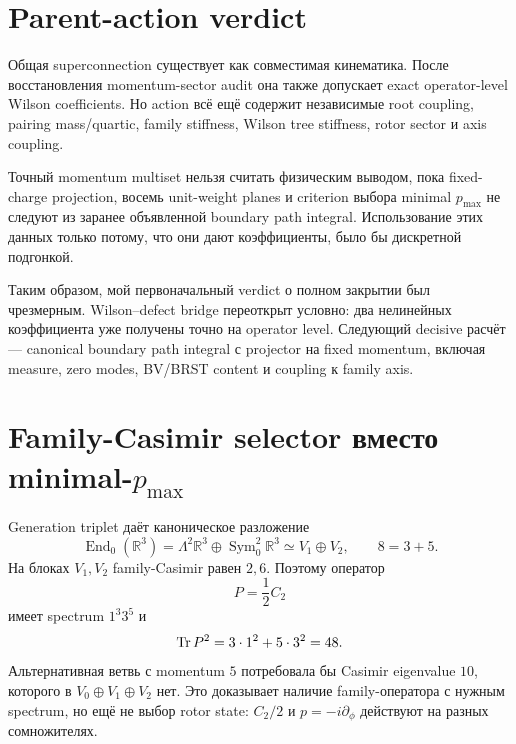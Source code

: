\section{Parent-action verdict}

Общая superconnection существует как совместимая кинематика. После
восстановления momentum-sector audit она также допускает exact operator-level
Wilson coefficients. Но action всё ещё содержит независимые root coupling,
pairing mass/quartic, family stiffness, Wilson tree stiffness, rotor sector
и axis coupling.

\begin{nogocriterion}
Точный momentum multiset нельзя считать физическим выводом, пока fixed-charge
projection, восемь unit-weight planes и criterion выбора minimal
\(p_{\max}\) не следуют из заранее объявленной boundary path integral.
Использование этих данных только потому, что они дают коэффициенты, было бы
дискретной подгонкой.
\end{nogocriterion}

Таким образом, мой первоначальный verdict о полном закрытии был чрезмерным.
Wilson--defect bridge переоткрыт условно: два нелинейных коэффициента уже
получены точно на operator level. Следующий decisive расчёт --- canonical
boundary path integral с projector на fixed momentum, включая measure,
zero modes, BV/BRST content и coupling к family axis.

\section{Family-Casimir selector вместо
\texorpdfstring{minimal-\(p_{\max}\)}{minimal-pmax}}

Generation triplet даёт каноническое разложение
\begin{equation}
 \operatorname{End}_0(\mathbb R^3)
 =\Lambda^2\mathbb R^3\oplus\operatorname{Sym}^2_0\mathbb R^3
 \simeq V_1\oplus V_2,
 \qquad 8=3+5.
\end{equation}
На блоках \(V_1,V_2\) family-Casimir равен \(2,6\). Поэтому оператор
\begin{equation}
 P=\frac12C_2
\end{equation}
имеет spectrum \(1^3 3^5\) и
\begin{equation}
 \operatorname{Tr} P^2=3\cdot1^2+5\cdot3^2=48.
\end{equation}
Альтернативная ветвь с momentum \(5\) потребовала бы Casimir eigenvalue
\(10\), которого в \(V_0\oplus V_1\oplus V_2\) нет. Это доказывает наличие
family-оператора с нужным spectrum, но ещё не выбор rotor state:
\(C_2/2\) и \(p=-i\partial_\phi\) действуют на разных сомножителях.

